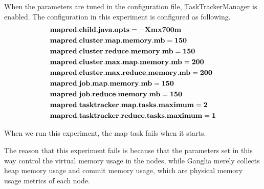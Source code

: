 When the parameters are tuned in the configuration file, TaskTrackerManager is enabled. The configuration in this experiment is configured as following.
\begin{align*}
&{\bf mapred.child.java.opts = -Xmx700m}\\
&{\bf mapred.cluster.map.memory.mb = 150}\\
&{\bf mapred.cluster.reduce.memory.mb = 150}\\
&{\bf mapred.cluster.max.map.memory.mb = 200}\\
&{\bf mapred.cluster.max.reduce.memory.mb = 200}\\
&{\bf mapred.job.map.memory.mb = 150}\\
&{\bf mapred.job.reduce.memory.mb = 150}\\
&{\bf mapred.tasktracker.map.tasks.maximum = 2}\\
&{\bf mapred.tasktracker.reduce.tasks.maximum = 1}\\
\end{align*}

When we run this experiment, the map task fails when it starts.
\par
The reason that this experiment fails is because that the parameters set in this way control the virtual memory usage in the nodes, while Ganglia merely collects heap memory usage and commit memory usage, which are physical memory usage metrics of each node. 